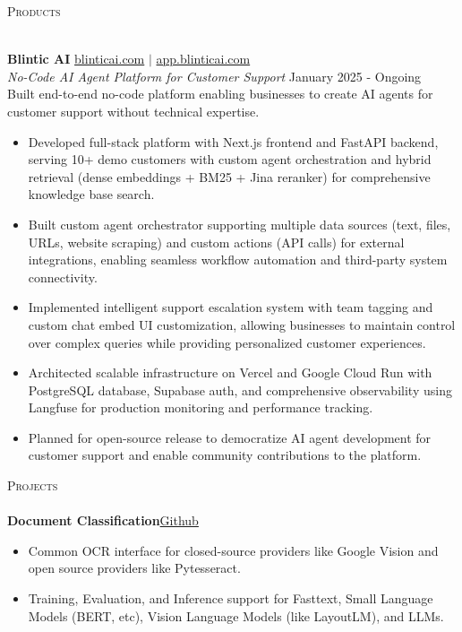 \documentclass[a4paper]{article}
\newcommand{\lineunder} {
    \vspace*{-8pt} \\
    \hspace*{-18pt} \hrulefill \\
}
\newcommand{\header} [1] {
    {\hspace*{-18pt}\vspace*{6pt} \textsc{#1}}
    \vspace*{-6pt} \lineunder
}
\begin{document}
\vspace*{2mm}

\header{Products}
\vspace{1mm}

\textbf{Blintic AI} \hfill \href{https://www.blinticai.com/}{blinticai.com} $|$ \href{https://app.blinticai.com}{app.blinticai.com}\\
\textit{No-Code AI Agent Platform for Customer Support} \hfill January 2025 - Ongoing\\

{Built end-to-end no-code platform enabling businesses to create AI agents for customer support without technical expertise.}
\begin{itemize} \itemsep 0pt
    \item Developed full-stack platform with Next.js frontend and FastAPI backend, serving 10+ demo customers with custom agent orchestration and hybrid retrieval (dense embeddings + BM25 + Jina reranker) for comprehensive knowledge base search.
    \item Built custom agent orchestrator supporting multiple data sources (text, files, URLs, website scraping) and custom actions (API calls) for external integrations, enabling seamless workflow automation and third-party system connectivity.
    \item Implemented intelligent support escalation system with team tagging and custom chat embed UI customization, allowing businesses to maintain control over complex queries while providing personalized customer experiences.
    \item Architected scalable infrastructure on Vercel and Google Cloud Run with PostgreSQL database, Supabase auth, and comprehensive observability using Langfuse for production monitoring and performance tracking.
    \item Planned for open-source release to democratize AI agent development for customer support and enable community contributions to the platform.
\end{itemize}
\vspace*{2mm}


\header{Projects}
{\textbf{Document Classification}}\hfill \href{https://github.com/amit-timalsina/document-classification}{Github}
\vspace{-2mm}
\begin{itemize} \itemsep 0pt
    \item Common OCR interface for closed-source providers like Google Vision and open source providers like Pytesseract.
    \item Training, Evaluation, and Inference support for Fasttext, Small Language Models (BERT, etc), Vision Language Models (like LayoutLM), and LLMs.
\end{itemize}
\end{document}
